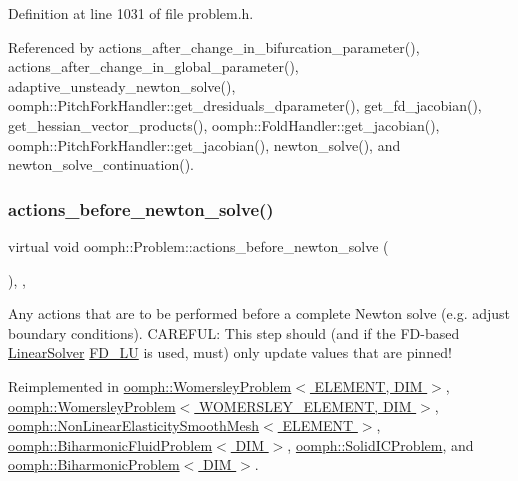 Definition at line 1031 of file problem.\+h.



Referenced by actions\+\_\+after\+\_\+change\+\_\+in\+\_\+bifurcation\+\_\+parameter(), actions\+\_\+after\+\_\+change\+\_\+in\+\_\+global\+\_\+parameter(), adaptive\+\_\+unsteady\+\_\+newton\+\_\+solve(), oomph\+::\+Pitch\+Fork\+Handler\+::get\+\_\+dresiduals\+\_\+dparameter(), get\+\_\+fd\+\_\+jacobian(), get\+\_\+hessian\+\_\+vector\+\_\+products(), oomph\+::\+Fold\+Handler\+::get\+\_\+jacobian(), oomph\+::\+Pitch\+Fork\+Handler\+::get\+\_\+jacobian(), newton\+\_\+solve(), and newton\+\_\+solve\+\_\+continuation().

\mbox{\label{classoomph_1_1Problem_a0c8d70891f7369bb4bf8412fa1a08ecb}} 
\subsubsection{\texorpdfstring{actions\+\_\+before\+\_\+newton\+\_\+solve()}{actions\_before\_newton\_solve()}}
{\footnotesize\ttfamily virtual void oomph\+::\+Problem\+::actions\+\_\+before\+\_\+newton\+\_\+solve (\begin{DoxyParamCaption}{ }\end{DoxyParamCaption})\hspace{0.3cm}{\ttfamily [inline]}, {\ttfamily [protected]}, {\ttfamily [virtual]}}



Any actions that are to be performed before a complete Newton solve (e.\+g. adjust boundary conditions). C\+A\+R\+E\+F\+UL\+: This step should (and if the F\+D-\/based \hyperlink{classoomph_1_1LinearSolver}{Linear\+Solver} \hyperlink{classoomph_1_1FD__LU}{F\+D\+\_\+\+LU} is used, must) only update values that are pinned! 



Reimplemented in \hyperlink{classoomph_1_1WomersleyProblem_a7aa82fe18099c9770edf9fa8e79a2028}{oomph\+::\+Womersley\+Problem$<$ E\+L\+E\+M\+E\+N\+T, D\+I\+M $>$}, \hyperlink{classoomph_1_1WomersleyProblem_a7aa82fe18099c9770edf9fa8e79a2028}{oomph\+::\+Womersley\+Problem$<$ W\+O\+M\+E\+R\+S\+L\+E\+Y\+\_\+\+E\+L\+E\+M\+E\+N\+T, D\+I\+M $>$}, \hyperlink{classoomph_1_1NonLinearElasticitySmoothMesh_a778763122903088b5234fcf7ca35a0b5}{oomph\+::\+Non\+Linear\+Elasticity\+Smooth\+Mesh$<$ E\+L\+E\+M\+E\+N\+T $>$}, \hyperlink{classoomph_1_1BiharmonicFluidProblem_ad62b36f8b36faae1324fe29fcd8e0875}{oomph\+::\+Biharmonic\+Fluid\+Problem$<$ D\+I\+M $>$}, \hyperlink{classoomph_1_1SolidICProblem_ad234d3268b330cd2f532548103cb60fc}{oomph\+::\+Solid\+I\+C\+Problem}, and \hyperlink{classoomph_1_1BiharmonicProblem_a161f8a00ca635684bfd54880925cd5bf}{oomph\+::\+Biharmonic\+Problem$<$ D\+I\+M $>$}.



